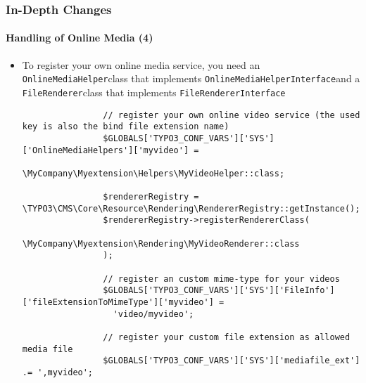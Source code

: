 \begin{frame}[fragile]
	\frametitle{In-Depth Changes}
	\framesubtitle{Handling of Online Media (4)}

	\lstset{basicstyle=\tiny\ttfamily}

	\begin{itemize}

		\item To register your own online media service, you need an
			\small\texttt{OnlineMediaHelper}\normalsize\space class that implements
			\small\texttt{OnlineMediaHelperInterface}\normalsize\space and a
			\small\texttt{FileRenderer}\normalsize\space class that implements
			\small\texttt{FileRendererInterface}\normalsize\space

			\begin{lstlisting}
				// register your own online video service (the used key is also the bind file extension name)
				$GLOBALS['TYPO3_CONF_VARS']['SYS']['OnlineMediaHelpers']['myvideo'] =
				  \MyCompany\Myextension\Helpers\MyVideoHelper::class;

				$rendererRegistry = \TYPO3\CMS\Core\Resource\Rendering\RendererRegistry::getInstance();
				$rendererRegistry->registerRendererClass(
				  \MyCompany\Myextension\Rendering\MyVideoRenderer::class
				);

				// register an custom mime-type for your videos
				$GLOBALS['TYPO3_CONF_VARS']['SYS']['FileInfo']['fileExtensionToMimeType']['myvideo'] =
				  'video/myvideo';

				// register your custom file extension as allowed media file
				$GLOBALS['TYPO3_CONF_VARS']['SYS']['mediafile_ext'] .= ',myvideo';
			\end{lstlisting}

	\end{itemize}

\end{frame}


